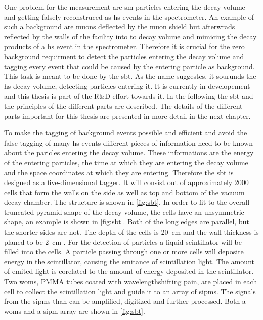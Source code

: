 One problem for the measurement are \ac{sm} particles entering the decay volume and getting falsely reconstruced as \ac{hs} events in the spectrometer.
An example of such a background are muons deflected by the muon shield but afterwrads reflected by the walls of the facility into to decay volume and mimicing the decay products of a \ac{hs} event in the spectrometer.
Therefore it is crucial for the zero background requirment to detect the particles entering the decay volume and tagging every event that could be caused by the entering particle as background.
This task is meant to be done by the \ac{sbt}.
As the name suggestes, it sourunds the \ac{hs} decay volume, detecting particles entering it.
It is currently in developement and this thesis is part of the R\&D effort towards it.
In the following the \ac{sbt} and the principles of the different parts are described.
The details of the different parts important for this thesis are presented in more detail in the next chapter.

To make the tagging of background events possible and efficient and avoid the false tagging of many \ac{hs} events different pieces of information need to be known about the paricles entering the decay volume.
These informations are the energy of the entering particles, the time at which they are entering the decay volume and the space coordinates at which they are entering.
Therefore the \ac{sbt} is designed as a five-dimensional tagger.
It will consist out of approximately 2000 cells that form the walls on the side as well as top and bottom of the vacuum decay chamber.
The structure is shown in \autoref{fig:sbt}.
In order to fit to the overall truncated pyramid shape of the decay volume, the cells have an unsymmetric shape, an example is shown in \autoref{fig:sbt}.
Both of the long edges are parallel, but the shorter sides are not.
The depth of the cells is \SI{20}{\centi\meter} and the wall thickness is planed to be \SI{2}{\centi\meter} \cite{}.
For the detection of particles a liquid scintillator will be filled into the cells.
A particle passing through one or more cells will deposite energy in the scintillator, causing the emitance of scintillation light.
The amount of emited light is corelated to the amount of energy deposited in the scintillator.
Two \acp{wom}, PMMA tubes coated with wavelengthshifting pain, are placed in each cell to collect the scintillation light and guide it to an array of \acp{sipm}.
The signals from the \acp{sipm} than can be amplified, digitized and further processed.
Both a \acp{wom} and a \ac{sipm} array are shown in \autoref{fig:sbt}.

